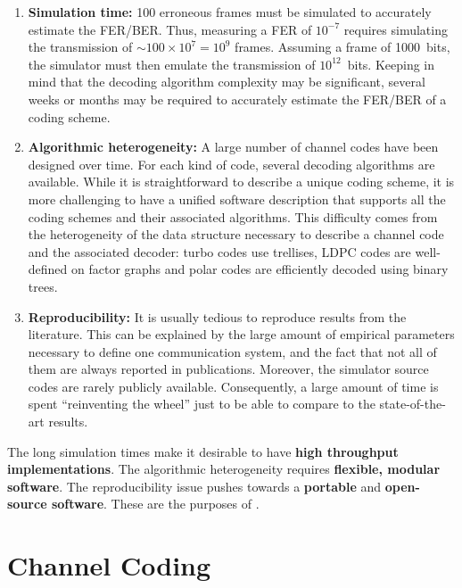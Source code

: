 \begin{enumerate}
  \item \textbf{Simulation time:}
    100 erroneous frames must be simulated to accurately estimate the FER/BER.
    Thus, measuring a FER of $10^{-7}$ requires simulating the transmission of
    $\sim100\times 10^7=10^9$ frames. Assuming a frame of 1000~bits, the
    simulator must then emulate the transmission of $10^{12}$~bits. Keeping in
    mind that the decoding algorithm complexity may be significant, several
    weeks or months may be required to accurately estimate the FER/BER of a
    coding scheme.

  \item \textbf{Algorithmic heterogeneity:} A large number of channel codes have
    been designed over time. For each kind of code, several decoding algorithms
    are available. While it is straightforward to describe a unique coding
    scheme, it is more challenging to have a unified software description that
    supports all the coding schemes and their associated algorithms. This
    difficulty comes from the heterogeneity of the data structure necessary to
    describe a channel code and the associated decoder: turbo codes use
    trellises, LDPC codes are well-defined on factor graphs and polar codes are
    efficiently decoded using binary trees.

  \item \textbf{Reproducibility:} It is usually tedious to reproduce results
    from the literature. This can be explained by the large amount of empirical
    parameters necessary to define one communication system, and the fact that
    not all of them are always reported in publications. Moreover, the simulator
    source codes are rarely publicly available. Consequently, a large amount of
    time is spent ``reinventing the wheel'' just to be able to compare to the
    state-of-the-art results.
\end{enumerate}

The long simulation times make it desirable to have \textbf{high throughput
implementations}. The algorithmic heterogeneity requires \textbf{flexible,
modular software}. The reproducibility issue pushes towards a \textbf{portable}
and \textbf{open-source software}. These are the purposes of \AFFECT.

\section{Channel Coding}

